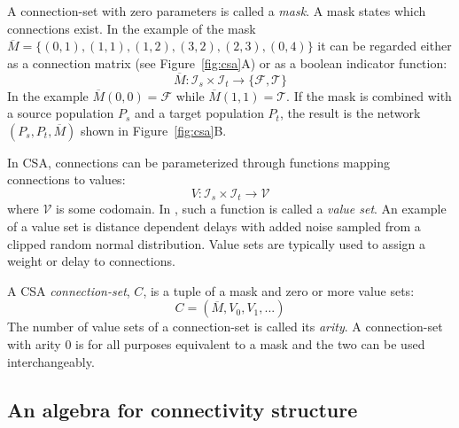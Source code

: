 \documentclass{frontiersSCNS} %
\newcommand{\Figure}[2]{Figure~\ref{#2}}
\newcommand{\Figure}[2]{Figure~#1}
\begin{document}
A connection-set with zero parameters is called a \emph{mask}. A mask
states which connections exist.  In the example of the mask
$\overline{M} = \{(0,1), (1,1), (1,2), (3,2), (2,3), (0,4)\}$ it can
be regarded either as a connection matrix (see \Figure{1}{fig:csa}A)
or as a boolean indicator function:
\begin{equation}
\overline{M} : \mathcal{I}_s \times \mathcal{I}_t \rightarrow \{ \mathcal{F},
\mathcal{T} \}
\end{equation}
In the example $\overline{M}(0,0) = \mathcal{F}$ while
$\overline{M}(1,1) = \mathcal{T}$. If the mask is combined with a
source population $P_s$ and a target population $P_t$, the result is
the network $(P_s, P_t, \overline{M})$ shown in \Figure{1}{fig:csa}B.

In CSA, connections can be parameterized through functions mapping
connections to values:
\begin{equation}
V : \mathcal{I}_s \times \mathcal{I}_t \rightarrow \mathcal{V}
\end{equation}
where $\mathcal{V}$ is some codomain. In \citet{djurfeldt12}, such a
function is called a \emph{value set}. An example of a value set is
distance dependent delays with added noise sampled from a clipped
random normal distribution. Value sets are typically used to assign a
weight or delay to connections.

A CSA \emph{connection-set}, $C$, is a tuple of a mask and zero or
more value sets:
\begin{equation}
C = (\overline{M}, V_0, V_1, ...)
\end{equation}
The number of value sets of a connection-set is called its
\emph{arity}. A connection-set with arity 0 is for all purposes
equivalent to a mask and the two can be used interchangeably.

\subsection{An algebra for connectivity structure}\label{sec:structure}
\end{document}
